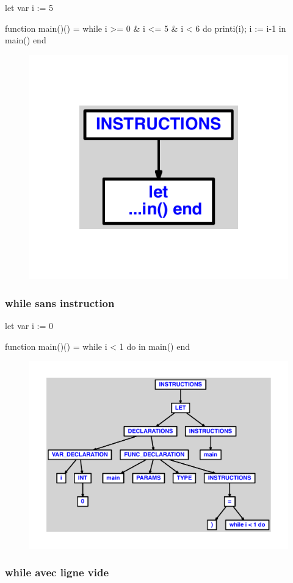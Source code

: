 \documentclass{article}
\begin{document}
\begin{verbatimtab}
let
	var i := 5

	function main()() =
		while i >= 0 & i <= 5 & i < 6 do
			printi(i);
			i := i-1
in main() end
\end{verbatimtab}
\begin{figure}[H]\centering\includegraphics[max width=\textwidth]{ast/ast_323.pdf}\end{figure}\subsubsection{while sans instruction}
\begin{verbatimtab}
let
	var i := 0

	function main()() =
		while i < 1 do
in main() end
\end{verbatimtab}
\begin{figure}[H]\centering\includegraphics[max width=\textwidth]{ast/ast_324.pdf}\end{figure}\subsubsection{while avec ligne vide}
\end{document}
